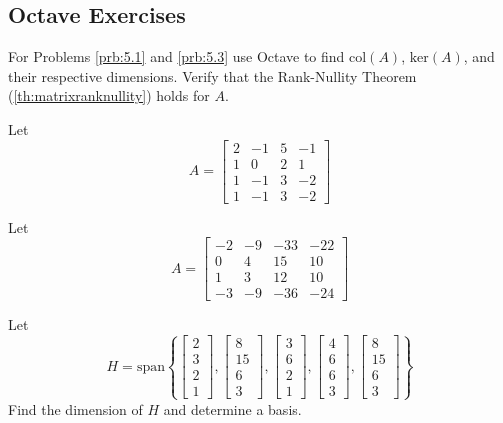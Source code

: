 \documentclass{ximera}
\begin{document}
\subsection*{Octave Exercises}
For Problems \ref{prb:5.1} and \ref{prb:5.3} use Octave to find $\text{col}(A)$, $\text{ker}(A)$, and their respective dimensions.  Verify that the Rank-Nullity Theorem (\ref{th:matrixranknullity}) holds for $A$.

\begin{problem}\label{prb:5.1} Let 
    $$A = 
\begin{bmatrix}
2 & -1 & 5 & -1\\
1 & 0 &2 & 1 \\
1 & -1 & 3 & -2\\
1 & -1 & 3 & -2
\end{bmatrix}$$ 
\end{problem}

\begin{problem}\label{prb:5.3} Let $$A=
\begin{bmatrix}
-2 & -9 & -33 & -22\\
0 & 4 & 15 & 10\\
1 & 3 & 12 & 10\\
-3 & -9 &-36 & -24
\end{bmatrix}$$ 
\end{problem}

\begin{problem}\label{prb:5.5} Let $$H=\mbox{span}\left\{ \left[
\begin{array}{r}
2 \\
3 \\
2 \\
1
\end{array}
\right] ,\left[
\begin{array}{r}
8 \\
15 \\
6 \\
3
\end{array}
\right] ,\left[
\begin{array}{r}
3 \\
6 \\
2 \\
1
\end{array}
\right] ,\left[
\begin{array}{r}
4 \\
6 \\
6 \\
3
\end{array}
\right] ,\left[
\begin{array}{r}
8 \\
15 \\
6 \\
3
\end{array}
\right] \right\} $$ 
Find the dimension of $H$ and determine a basis.

\end{problem}
\end{document}
